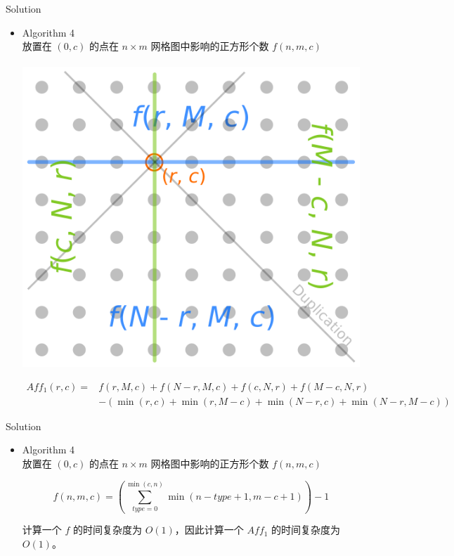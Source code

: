 \documentclass[UTF8]{beamer}
\begin{document}
\begin{frame}{Solution}

\begin{itemize}
    \item Algorithm 4 \\
        放置在 $(0, c)$ 的点在 $n \times m$ 网格图中影响的正方形个数 $f(n, m, c)$ \\　\\

        \includegraphics[scale=0.8]{square-aff1.png}

        \small{
        \begin{equation*}\begin{split}
            Aff_1(r, c) = &f(r, M, c) + f(N - r, M, c) + f(c, N, r) + f(M - c, N, r) \\
                & - (\min(r, c) + \min(r, M - c) + \min(N - r, c) + \min(N - r, M - c))
        \end{split}\end{equation*}}
\end{itemize}

\end{frame}

\begin{frame}{Solution}

\begin{itemize}
    \item Algorithm 4 \\
        放置在 $(0, c)$ 的点在 $n \times m$ 网格图中影响的正方形个数 $f(n, m, c)$

        $$
            f(n, m, c) = (\sum_{type = 0}^{\min(c, n)} \min(n - type + 1, m - c + 1)) - 1
        $$

        计算一个 $f$ 的时间复杂度为 $O(1)$，因此计算一个 $Aff_1$ 的时间复杂度为 $O(1)$。
\end{itemize}

\end{frame}
\end{document}
